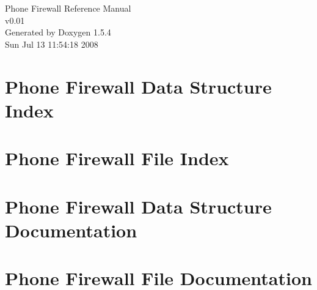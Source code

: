 \documentclass[a4paper]{book}
\begin{document}
\begin{titlepage}
\vspace*{7cm}
\begin{center}
{\Large Phone Firewall Reference Manual\\[1ex]\large v0.01 }\\
\vspace*{1cm}
{\large Generated by Doxygen 1.5.4}\\
\vspace*{0.5cm}
{\small Sun Jul 13 11:54:18 2008}\\
\end{center}
\end{titlepage}
\clearemptydoublepage
{}
\tableofcontents
\clearemptydoublepage
{}
\chapter{Phone Firewall Data Structure Index}

\chapter{Phone Firewall File Index}

\chapter{Phone Firewall Data Structure Documentation}


\chapter{Phone Firewall File Documentation}









\printindex
\end{document}
